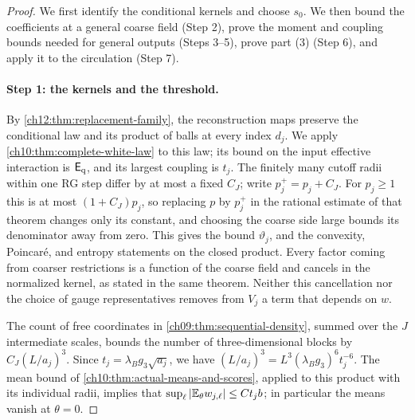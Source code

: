 \begin{proof}
We first identify the conditional kernels and choose $s_0$. We then bound the coefficients at a general coarse field (Step 2), prove the moment and coupling bounds needed for general outputs (Steps 3--5), prove part (3) (Step 6), and apply it to the circulation (Step 7).

\paragraph{Step 1: the kernels and the threshold.}
By \cref{ch12:thm:replacement-family}, the reconstruction maps preserve the conditional law and its product of balls at every index $d_j$. We apply \cref{ch10:thm:complete-white-law} to this law; its bound on the input effective interaction is $\mathsf E_{\rm q}$, and its largest coupling is $t_j$. The finitely many cutoff radii within one RG step differ by at most a fixed $C_J$; write $p_j^+=p_j+C_J$. For $p_j\ge1$ this is at most $(1+C_J)p_j$, so replacing $p$ by $p_j^+$ in the rational estimate of that theorem changes only its constant, and choosing the coarse side large bounds its denominator away from zero. This gives the bound $\vartheta_j$, and the convexity, Poincaré, and entropy statements on the closed product. Every factor coming from coarser restrictions is a function of the coarse field and cancels in the normalized kernel, as stated in the same theorem. Neither this cancellation nor the choice of gauge representatives removes from $V_j$ a term that depends on $w$.

The count of free coordinates in \cref{ch09:thm:sequential-density}, summed over the $J$ intermediate scales, bounds the number of three-dimensional blocks by $C_J(L/a_j)^3$. Since $t_j=\lambda_Bg_3\sqrt{a_j}$, we have $(L/a_j)^3=L^3(\lambda_Bg_3)^6t_j^{-6}$. The mean bound of \cref{ch10:thm:actual-means-and-scores}, applied to this product with its individual radii, implies that $\sup_\ell|\mathbb E_\theta w_{j,\ell}|\le Ct_jb$; in particular the means vanish at $\theta=0$.


\end{proof}
